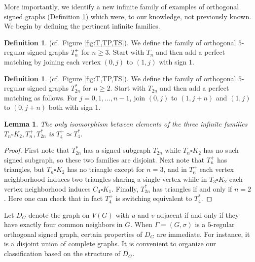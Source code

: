 \documentclass[11pt]{article}
\theoremstyle{plain}
\newtheorem{lemma}[theorem]{Lemma}
\theoremstyle{definition}
\newtheorem{definition}[theorem]{Definition}
\begin{document}
More importantly, we identify a new infinite family of examples of orthogonal signed graphs (Definition \ref{defTast}) which were, to our knowledge, not previously known. We begin by defining the pertinent infinite families.


\begin{definition}\label{defT+} (cf.~Figure \ref{fig:T,TP,TS}).
We define the  family of orthogonal $5$-regular signed graphs $T^+_{n}$ for $n\geqslant 3$. Start with $T_{n}$ and then add a perfect matching by joining
each vertex $(0,j)$  to
$(1,j)$ with sign $1$. 
\end{definition}

\begin{definition}\label{defTast} (cf.~Figure \ref{fig:T,TP,TS}).
We define the  family of orthogonal $5$-regular signed graphs $T^{\ast}_{2n}$ for $n\geqslant 2$. Start with $T_{2n}$ and  then  add a perfect matching as follows.
For $j=0,1,\ldots,n-1$, join $(0,j)$  to $(1,j+n)$ and $(1,j)$  to $(0,j+n)$ both with sign 1.
\end{definition}

\begin{lemma}\label{remcases}
The only isomorphism between elements of the three infinite families  $T_{n}\square K_2,T^+_{n},T^{\ast}_{2n}$ is  $T^+_{4}\simeq T^{\ast}_{4}$. 
\end{lemma}

\begin{proof}
First note that $T^{\ast}_{2n}$ has a signed subgraph $T_{2n}$ while $T_{n}\square K_2$ has no such signed subgraph, so these two families are disjoint. Next note that $T^+_{n}$ has triangles, but $T_{n}\square K_2$ has no triangle except for $n=3$, and in $T^+_6$ each vertex neighborhood induces two triangles sharing a single vertex while in $T_3\square K_2$ each vertex neighborhood induces $C_4\square K_1$. Finally, $T^{\ast}_{2n}$  has
triangles if and only if $n=2$. Here one can check that in fact $T^+_{4}$ is switching equivalent to $T^{\ast}_{4}$.
\end{proof}



Let $D_G$ denote the graph on $V(G)$ with $u$ and $v$ adjacent if and only if they have exactly four common neighbors in $G$. When $\Gamma=(G,\sigma)$ is a $5$-regular orthogonal signed graph, certain properties of $D_G$ are immediate. For instance, it is a disjoint union of complete graphs. It is convenient to organize our classification based on the structure of $D_G$.
\end{document}
